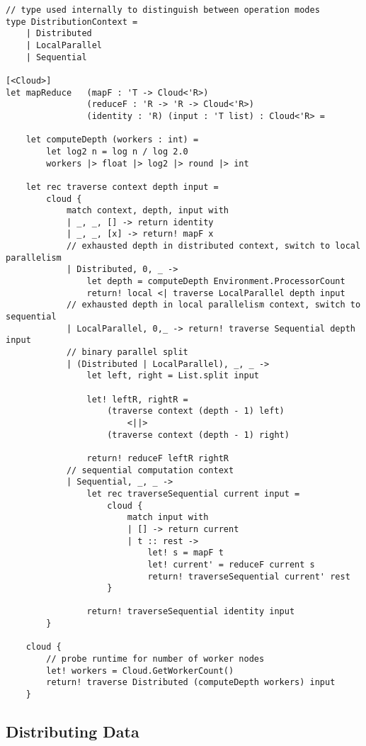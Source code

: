 \begin{lstlisting}
// type used internally to distinguish between operation modes
type DistributionContext =
    | Distributed
    | LocalParallel
    | Sequential

[<Cloud>]
let mapReduce   (mapF : 'T -> Cloud<'R>)
                (reduceF : 'R -> 'R -> Cloud<'R>)
                (identity : 'R) (input : 'T list) : Cloud<'R> =

    let computeDepth (workers : int) = 
        let log2 n = log n / log 2.0
        workers |> float |> log2 |> round |> int
 
    let rec traverse context depth input =
        cloud {
            match context, depth, input with
            | _, _, [] -> return identity
            | _, _, [x] -> return! mapF x
            // exhausted depth in distributed context, switch to local parallelism
            | Distributed, 0, _ ->
            	let depth = computeDepth Environment.ProcessorCount
                return! local <| traverse LocalParallel depth input
            // exhausted depth in local parallelism context, switch to sequential
            | LocalParallel, 0,_ -> return! traverse Sequential depth input
            // binary parallel split
            | (Distributed | LocalParallel), _, _ ->
                let left, right = List.split input

                let! leftR, rightR = 
                    (traverse context (depth - 1) left) 
                        <||> 
                    (traverse context (depth - 1) right)

                return! reduceF leftR rightR
            // sequential computation context
            | Sequential, _, _ ->
                let rec traverseSequential current input =
                    cloud {
                        match input with
                        | [] -> return current
                        | t :: rest ->
                            let! s = mapF t
                            let! current' = reduceF current s
                            return! traverseSequential current' rest
                    }

                return! traverseSequential identity input
        }

    cloud {
    	// probe runtime for number of worker nodes
        let! workers = Cloud.GetWorkerCount()
        return! traverse Distributed (computeDepth workers) input
    }
\end{lstlisting}

\subsection{Distributing Data}

